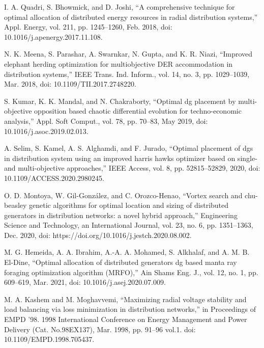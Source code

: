 \documentclass[conference]{IEEEtran}
\begin{document}
\begin{thebibliography}{00}
 I. A. Quadri, S. Bhowmick, and D. Joshi, “A comprehensive technique for optimal allocation of distributed energy resources in radial distribution systems,” Appl. Energy, vol. 211, pp. 1245–1260, Feb. 2018, doi: 10.1016/j.apenergy.2017.11.108.

 N. K. Meena, S. Parashar, A. Swarnkar, N. Gupta, and K. R. Niazi, “Improved elephant herding optimization for multiobjective DER accommodation in distribution systems,” IEEE Trans. Ind. Inform., vol. 14, no. 3, pp. 1029–1039, Mar. 2018, doi: 10.1109/TII.2017.2748220.

 S. Kumar, K. K. Mandal, and N. Chakraborty, “Optimal dg placement by multi-objective opposition based chaotic differential evolution for techno-economic analysis,” Appl. Soft Comput., vol. 78, pp. 70–83, May 2019, doi: 10.1016/j.asoc.2019.02.013.

 A. Selim, S. Kamel, A. S. Alghamdi, and F. Jurado, “Optimal placement of dgs in distribution system using an improved harris hawks optimizer based on single- and multi-objective approaches,” IEEE Access, vol. 8, pp. 52815–52829, 2020, doi: 10.1109/ACCESS.2020.2980245.

 O. D. Montoya, W. Gil-González, and C. Orozco-Henao, “Vortex search and chu-beasley genetic algorithms for optimal location and sizing of distributed generators in distribution networks: a novel hybrid approach,” Engineering Science and Technology, an International Journal, vol. 23, no. 6, pp. 1351–1363, Dec. 2020, doi: https://doi.org/10.1016/j.jestch.2020.08.002.

 M. G. Hemeida, A. A. Ibrahim, A.-A. A. Mohamed, S. Alkhalaf, and A. M. B. El-Dine, “Optimal allocation of distributed generators dg based manta ray foraging optimization algorithm (MRFO),” Ain Shams Eng. J., vol. 12, no. 1, pp. 609–619, Mar. 2021, doi: 10.1016/j.asej.2020.07.009.

 M. A. Kashem and M. Moghavvemi, “Maximizing radial voltage stability and load balancing via loss minimization in distribution networks,” in Proceedings of EMPD ’98. 1998 International Conference on Energy Management and Power Delivery (Cat. No.98EX137), Mar. 1998, pp. 91–96 vol.1. doi: 10.1109/EMPD.1998.705437.


\end{thebibliography}
\end{document}
